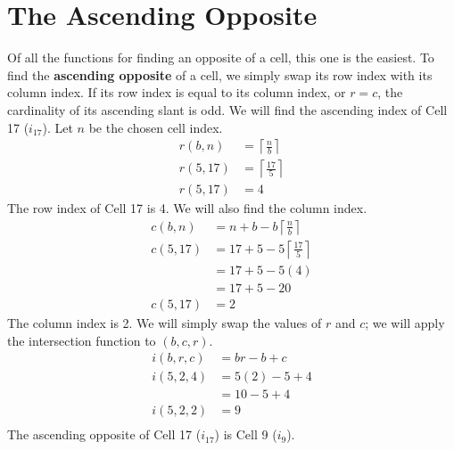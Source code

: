 \documentclass[letterpaper, twoside,12pt]{book}
\begin{document}
    \section{The Ascending Opposite}
    Of all the functions for finding an opposite of a cell, this one is the easiest. To find the \textbf{ascending opposite} of a cell, we simply swap its row index with its column index. If its row index is equal to its column index, or $r=c$, the cardinality of its ascending slant is odd. We will find the ascending index of Cell 17 ($i_{17}$). Let $n$ be the chosen cell index.
    \begin{equation}
        \begin{split}
            r(b,n) &= \left\lceil \frac{n}{b}\right\rceil \\
            r(5,17) &= \left\lceil \frac{17}{5}\right\rceil \\
            r(5,17) &= 4
        \end{split}
    \end{equation}
    The row index of Cell 17 is 4. We will also find the column index.
    \begin{equation}
        \begin{split}
            c(b,n) &= n + b - b\left\lceil \frac{n}{b}\right\rceil \\
            c(5,17) &= 17 + 5 - 5\left\lceil \frac{17}{5}\right\rceil \\
                &= 17 + 5 - 5(4) \\
                &= 17 + 5 - 20 \\
            c(5,17) &= 2
        \end{split}
    \end{equation}
    The column index is 2. We will simply swap the values of $r$ and $c$; we will apply the intersection function to $(b,c,r)$.
    \begin{equation}
        \begin{split}
            i(b,r,c) &= br - b + c \\
            i(5,2,4) &= 5(2) - 5 + 4 \\
                &= 10 - 5 + 4 \\
            i(5,2,2) &= 9 \\
        \end{split}
    \end{equation}
    \newpage
    The ascending opposite of Cell 17 ($i_{17}$) is Cell 9 ($i_{9}$).
\end{document}
